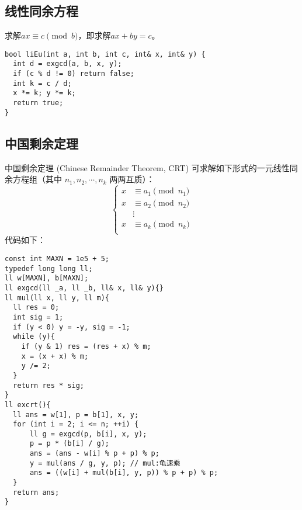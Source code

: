 \subsection{线性同余方程}
求解$ax\equiv c\pmod b$，即求解$ax+by=c$。
\begin{lstlisting}
bool liEu(int a, int b, int c, int& x, int& y) {
  int d = exgcd(a, b, x, y);
  if (c % d != 0) return false;
  int k = c / d;
  x *= k; y *= k;
  return true;
}
\end{lstlisting}
\subsection{中国剩余定理}
中国剩余定理 (Chinese Remainder Theorem, CRT) 可求解如下形式的一元线性同余方程组（其中 $n_1, n_2, \cdots, n_k$ 两两互质）：
\begin{equation*}
  \begin{cases}
  x &\equiv a_1 \pmod {n_1} \\
  x &\equiv a_2 \pmod {n_2} \\
    &\vdots \\
  x &\equiv a_k \pmod {n_k} \\
  \end{cases}
\end{equation*}代码如下：
\begin{lstlisting}
const int MAXN = 1e5 + 5;
typedef long long ll;
ll w[MAXN], b[MAXN];
ll exgcd(ll _a, ll _b, ll& x, ll& y){}
ll mul(ll x, ll y, ll m){
  ll res = 0;
  int sig = 1;
  if (y < 0) y = -y, sig = -1;
  while (y){
    if (y & 1) res = (res + x) % m;
    x = (x + x) % m;
    y /= 2;
  }
  return res * sig;
}
ll excrt(){
  ll ans = w[1], p = b[1], x, y;
  for (int i = 2; i <= n; ++i) {
      ll g = exgcd(p, b[i], x, y);
      p = p * (b[i] / g);
      ans = (ans - w[i] % p + p) % p;
      y = mul(ans / g, y, p); // mul:龟速乘
      ans = ((w[i] + mul(b[i], y, p)) % p + p) % p;
  }
  return ans;
}
\end{lstlisting}
